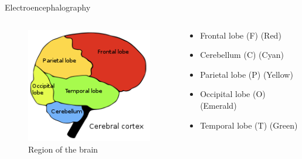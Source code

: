 \documentclass[xcolor=dvipsnames]{beamer} %
\begin{document}
    \begin{frame}{Electroencephalography}
        \begin{columns}
        	
        \begin{column}{0.5\textwidth}
        	\begin{figure}
        		\centering
        		\includegraphics[scale=0.7]{images/Brain.png}
        		\caption{Region of the brain}
        		\label{fig:region}
        	\end{figure}
        \end{column}	
        	
        \begin{column}{0.5\textwidth}
            \begin{itemize}
            \item Frontal lobe (F) (Red)
            \pause
            \item Cerebellum (C) (Cyan)
            \pause
            \item Parietal lobe (P) (Yellow)
            \pause
            \item Occipital lobe (O) (Emerald)
            \pause
            \item Temporal lobe (T) (Green)
            \end{itemize}
        \end{column}
        
        \end{columns}
    \end{frame}
    
\end{document}
